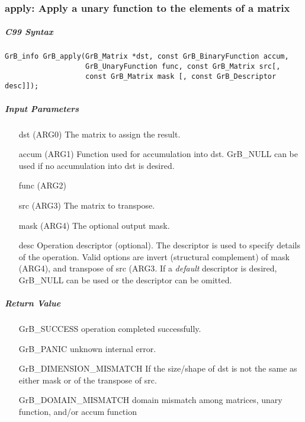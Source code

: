 \subsubsection{{\sf apply}: Apply a unary function to the elements of a matrix}


\subparagraph{C99 Syntax}

\begin{verbatim}
GrB_info GrB_apply(GrB_Matrix *dst, const GrB_BinaryFunction accum,
                   GrB_UnaryFunction func, const GrB_Matrix src[,
                   const GrB_Matrix mask [, const GrB_Descriptor desc]]);
\end{verbatim}

\subparagraph{Input Parameters}

\begin{itemize}
	\item[{\sf dst}]   ({\sf ARG0}) The matrix to assign the result.
	\item[{\sf accum}] ({\sf ARG1}) Function used for accumulation into dst.  {\sf GrB\_NULL}
                       can be used if no accumulation into dst is desired.
    \item[{\sf func}]  ({\sf ARG2})
	\item[{\sf src}]   ({\sf ARG3}) The matrix to transpose.
    \item[{\sf mask}]  ({\sf ARG4}) The optional output mask.

	\item[{\sf desc}]  Operation descriptor (optional). The descriptor
    is used to specify details of the operation. Valid options are 
    invert (structural complement) of mask ({\sf ARG4}), and transpose of
    src ({\sf ARG3}. If a \emph{default} descriptor is desired,	{\sf GrB\_NULL} can be used or the descriptor can be omitted.
\end{itemize}

\subparagraph{Return Value}


\begin{itemize}[leftmargin=2.1in]
\item[{\sf GrB\_SUCCESS}] 	operation completed successfully.
\item[{\sf GrB\_PANIC}]	    unknown internal error.
\item[{\sf GrB\_DIMENSION\_MISMATCH}]	  	  
        If the size/shape of dst is not the same as either mask or
        of the transpose of src.
\item[{\sf GrB\_DOMAIN\_MISMATCH}]  
	    domain mismatch among matrices, unary function, and/or
        accum function 
\end{itemize}


